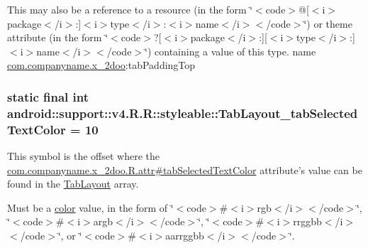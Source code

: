 This may also be a reference to a resource (in the form \char`\"{}$<$code$>$@\mbox{[}$<$i$>$package$<$/i$>$:\mbox{]}$<$i$>$type$<$/i$>$:$<$i$>$name$<$/i$>$$<$/code$>$\char`\"{}) or theme attribute (in the form \char`\"{}$<$code$>$?\mbox{[}$<$i$>$package$<$/i$>$:\mbox{]}\mbox{[}$<$i$>$type$<$/i$>$:\mbox{]}$<$i$>$name$<$/i$>$$<$/code$>$\char`\"{}) containing a value of this type.  name \hyperlink{namespacecom_1_1companyname_1_1x__2doo}{com.companyname.x\_\-2doo}:tabPaddingTop \hypertarget{classandroid_1_1support_1_1v4_1_1_r_1_1styleable_7c1ab99e50a37a18c9bf0c809debb859}{
\subsubsection[{TabLayout\_\-tabSelectedTextColor}]{\setlength{\rightskip}{0pt plus 5cm}static final int android::support::v4.R.R::styleable::TabLayout\_\-tabSelectedTextColor = 10}}
\label{classandroid_1_1support_1_1v4_1_1_r_1_1styleable_7c1ab99e50a37a18c9bf0c809debb859}


This symbol is the offset where the \hyperlink{classcom_1_1companyname_1_1x__2doo_1_1_r_1_1attr_f6f03ebe873ffebed9b51b845065aa15}{com.companyname.x\_\-2doo.R.attr\#tabSelectedTextColor} attribute's value can be found in the \hyperlink{classandroid_1_1support_1_1v4_1_1_r_1_1styleable_d1f1104cdc4fac0ab4797d48f7efe351}{TabLayout} array.

Must be a \hyperlink{classandroid_1_1support_1_1v4_1_1_r_1_1color}{color} value, in the form of \char`\"{}$<$code$>$\#$<$i$>$rgb$<$/i$>$$<$/code$>$\char`\"{}, \char`\"{}$<$code$>$\#$<$i$>$argb$<$/i$>$$<$/code$>$\char`\"{}, \char`\"{}$<$code$>$\#$<$i$>$rrggbb$<$/i$>$$<$/code$>$\char`\"{}, or \char`\"{}$<$code$>$\#$<$i$>$aarrggbb$<$/i$>$$<$/code$>$\char`\"{}. 

